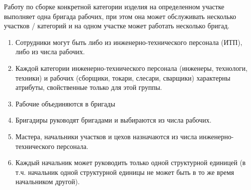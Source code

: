 Работу по сборке конкретной категории изделия на определенном участке выполняет одна бригада рабочих, при этом она может обслуживать несколько участков / категорий и на одном участке может работать несколько бригад.

\begin{enumerate}

    \item Сотрудники могут быть либо из инженерно-технического персонала (ИТП), либо из числа рабочих.
    \item Каждой категории инженерно-технического персонала (инженеры, технологи, техники) и рабочих (сборщики, токари, слесари, сварщики) характерны атрибуты, свойственные только для этой группы.
    \item Рабочие объединяются в бригады
    \item Бригадиры руководят бригадами и выбираются из числа рабочих.
    \item Мастера, начальники участков и цехов назначаются из числа инженерно-технического персонала.
    \item Каждый начальник может руководить только одной структурной единицей (в т.ч. начальник одной структурной единицы не может быть в то же время начальником другой).

\end{enumerate}

